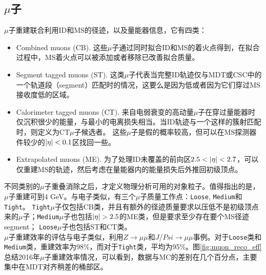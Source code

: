 \subsection{$\mu$子}
$\mu$子重建联合利用ID和MS的径迹，以及量能器信息，它有四类：
\begin{itemize}
 \item Combined muons (CB). 这些$\mu$子通过同时拟合ID和MS的着火点得到，在拟合过程中，MS着火点可以被添加或者移除已改善拟合质量。
 \item Segment tagged muons (ST). 这类$\mu$子代表当完整ID轨迹仅与MDT或CSC中的一个轨道段（segment）匹配时的情况，这要么是因为\pt 低或者因为它们穿过MS接收度低的区域。
 \item Calorimeter tagged muons (CT). 来自电弱衰变的高动量$\mu$子在穿过量能器时仅沉积很少的能量，与最小的电离损失相当。当ID轨迹与一个这样的簇射匹配时，则定义为CT$\mu$子候选者。 
 这些$\mu$子是假的概率较高，但可以在MS探测器件较少的$|\eta|<0.1$区找回一些。
 \item Extrapolated muons (ME). 为了处理ID未覆盖的前向区$2.5<\abseta<2.7$，可以仅重建MS的轨迹，然后考虑在量能器内的能量损失后外推回初级顶点。
\end{itemize}
不同类别的$\mu$子重叠消除之后，才定义物理分析可用的对象粒子。值得指出的是，$\mu$子重建可到4 GeV。与电子类似，有三个$\mu$子质量工作点：\texttt{Loose}, \texttt{Medium}和\texttt{Tight}。
\texttt{Tight}$\mu$子仅包括CB类，并且有额外的径迹质量要求以压低不是初级顶点来的$\mu$子；\texttt{Medium}$\mu$子也包括$\abseta>2.5$的ME类，但是要求至少存在要个MS径迹segment；
\texttt{Loose}$\mu$子也包括ST和CT类。\\
$\mu$子重建效率的评估与电子类似，利用$Z\rightarrow \mu\mu$和$J/Psi\rightarrow \mu\mu$事例\cite{Aad2016-mu2016}。对于\texttt{Loose}类和\texttt{Medium}类，重建效率为98\%，而对于\texttt{Tight}类，平均为95\%。图\ref{fig:muon_reco_eff}总结2016年$\mu$子重建效率情况，可以看到，数据与MC的差别在几个百分点，主要集中在MDT对齐稍差的桶部区。
